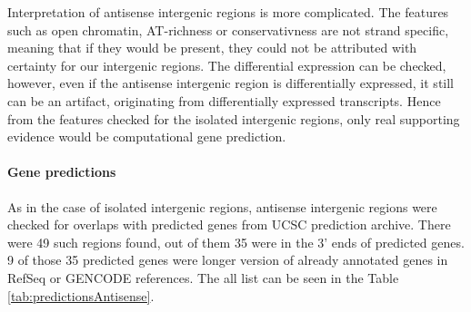 Interpretation of antisense intergenic regions is more complicated.
The features such as open chromatin, AT-richness or conservativness are not strand specific,
meaning that if they would be present, they could not be attributed with certainty for our intergenic regions.
The differential expression can be checked, however, even if the antisense intergenic region is differentially expressed,
it still can be an artifact, originating from differentially expressed transcripts.
Hence from the features checked for the isolated intergenic regions, only real supporting evidence would be computational gene prediction.

\paragraph{Gene predictions}

As in the case of isolated intergenic regions,
antisense intergenic regions were checked for overlaps with predicted genes from UCSC prediction archive.
There were 49 such regions found, out of them 35 were in the 3' ends of predicted genes.
9 of those 35 predicted genes were longer version of already annotated genes in RefSeq or GENCODE references.
The all list can be seen in the Table \ref{tab:predictionsAntisense}.

